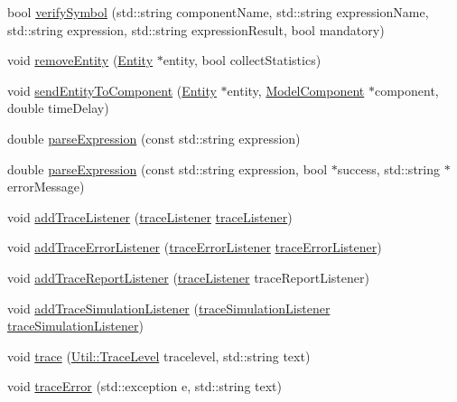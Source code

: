 \begin{DoxyCompactItemize}
\item 
bool \hyperlink{class_model_ae2be8579f8519eec5da9e6f72c7ec361}{verify\-Symbol} (std\-::string component\-Name, std\-::string expression\-Name, std\-::string expression, std\-::string expression\-Result, bool mandatory)
\item 
void \hyperlink{class_model_ae62bb3a21cd56fbf9d34195edf2fb9e0}{remove\-Entity} (\hyperlink{class_entity}{Entity} $\ast$entity, bool collect\-Statistics)
\item 
void \hyperlink{class_model_a244dff6d6bef962b0d95fbe712954079}{send\-Entity\-To\-Component} (\hyperlink{class_entity}{Entity} $\ast$entity, \hyperlink{class_model_component}{Model\-Component} $\ast$component, double time\-Delay)
\item 
double \hyperlink{class_model_a5ea283e339b50c0b77040bf908e25af3}{parse\-Expression} (const std\-::string expression)
\item 
double \hyperlink{class_model_a408ddfa761fcd04ec1211ae6c1526ab3}{parse\-Expression} (const std\-::string expression, bool $\ast$success, std\-::string $\ast$error\-Message)
\item 
void \hyperlink{class_model_a144f16211e64bdc0ac4622cda5f5f4ae}{add\-Trace\-Listener} (\hyperlink{_listener_8h_a5ce1a9a31f5f0fa77de45c6e6622c435}{trace\-Listener} \hyperlink{_listener_8h_a5ce1a9a31f5f0fa77de45c6e6622c435}{trace\-Listener})
\item 
void \hyperlink{class_model_a0b632c73e85b352d7ea914b30bb455f9}{add\-Trace\-Error\-Listener} (\hyperlink{_listener_8h_afad9be20bdf6a8241ae57bc2fcb678c7}{trace\-Error\-Listener} \hyperlink{_listener_8h_afad9be20bdf6a8241ae57bc2fcb678c7}{trace\-Error\-Listener})
\item 
void \hyperlink{class_model_ad94736b0e6c53b3dedd112f21506092a}{add\-Trace\-Report\-Listener} (\hyperlink{_listener_8h_a5ce1a9a31f5f0fa77de45c6e6622c435}{trace\-Listener} trace\-Report\-Listener)
\item 
void \hyperlink{class_model_a06f7035263e7ad33360651a9569ed2d6}{add\-Trace\-Simulation\-Listener} (\hyperlink{_listener_8h_a615775a0e20f41866ee44014f198fa59}{trace\-Simulation\-Listener} \hyperlink{_listener_8h_a615775a0e20f41866ee44014f198fa59}{trace\-Simulation\-Listener})
\item 
void \hyperlink{class_model_a5de086b514742e84b61ac9a7b128ae8b}{trace} (\hyperlink{class_util_a604561d00f5999b5ca280401140e58d9}{Util\-::\-Trace\-Level} tracelevel, std\-::string text)
\item 
void \hyperlink{class_model_a092b7062edcb59344f286d858ed10fac}{trace\-Error} (std\-::exception e, std\-::string text)

\end{DoxyCompactItemize}
